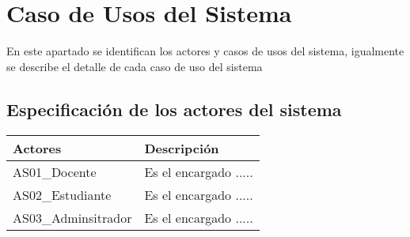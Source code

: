 \newcommand\tabularhead[1]{
\begin{table}[h]
  \caption{Caso de Uso  <<#1>>}
  \begin{tabular}{|p{0.2\linewidth}|p{0.8\linewidth}|}
    \hline
    \textbf{Caso de Uso} & \textbf{#1} \\
    \hline}

  \newcommand\addrow[2]{#1 &#2\\ \hline}

  \newcommand\addmulrow[2]{ \begin{minipage}[t][][t]{2.5cm}#1\end{minipage}%
     &\begin{minipage}[t][][t]{8cm}
      \begin{enumerate} #2   \end{enumerate}
      \end{minipage}\\ }

  \newenvironment{usecase}{\tabularhead}
{\hline\end{tabular}\end{table}}



\chapter{Caso de Usos del Sistema}

En este apartado se identifican los actores y casos de usos del sistema, igualmente se describe 
el detalle de cada caso de uso del sistema


\section{Especificación de los actores del sistema}


	\begin{table}[h!]	
		\begin{tabular}{ |p{4cm}|p{9cm}| }	\hline
			
			\rowcolor{gray!50}  \textbf{Actores}  &  \textbf{Descripción} \\ \hline
			
			AS01\_Docente & Es el encargado .....  \\	\hline
			
			AS02\_Estudiante & Es el encargado .....  \\	\hline
			
			AS03\_Adminsitrador & Es el encargado .....  \\	\hline
			
		\end{tabular}
	\end{table}	


